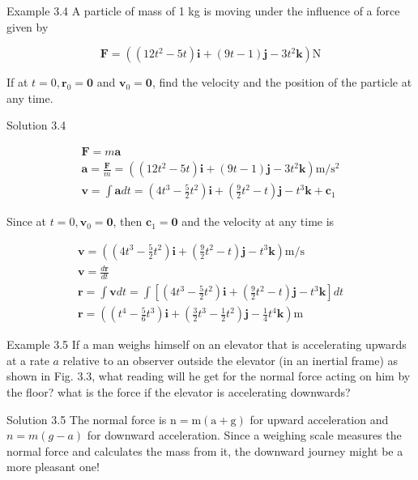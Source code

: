 \documentclass[10pt]{article}
\begin{document}
Example 3.4 A particle of mass of 1 kg is moving under the influence of a force given by

$$
\mathbf{F}=\left(\left(12 t^{2}-5 t\right) \mathbf{i}+(9 t-1) \mathbf{j}-3 t^{2} \mathbf{k}\right) \mathrm{N}
$$

If at $t=0, \mathbf{r}_{0}=\mathbf{0}$ and $\mathbf{v}_{0}=\mathbf{0}$, find the velocity and the position of the particle at any time.

Solution 3.4

$$
\begin{gathered}
\mathbf{F}=m \mathbf{a} \\
\mathbf{a}=\frac{\mathbf{F}}{m}=\left(\left(12 t^{2}-5 t\right) \mathbf{i}+(9 t-1) \mathbf{j}-3 t^{2} \mathbf{k}\right) \mathrm{m} / \mathrm{s}^{2} \\
\mathbf{v}=\int \mathbf{a} d t=\left(4 t^{3}-\frac{5}{2} t^{2}\right) \mathbf{i}+\left(\frac{9}{2} t^{2}-t\right) \mathbf{j}-t^{3} \mathbf{k}+\mathbf{c}_{1}
\end{gathered}
$$

Since at $t=0, \mathbf{v}_{0}=\mathbf{0}$, then $\mathbf{c}_{1}=\mathbf{0}$ and the velocity at any time is

$$
\begin{gathered}
\mathbf{v}=\left(\left(4 t^{3}-\frac{5}{2} t^{2}\right) \mathbf{i}+\left(\frac{9}{2} t^{2}-t\right) \mathbf{j}-t^{3} \mathbf{k}\right) \mathrm{m} / \mathrm{s} \\
\mathbf{v}=\frac{d \mathbf{r}}{d t} \\
\mathbf{r}=\int \mathbf{v} d t=\int\left[\left(4 t^{3}-\frac{5}{2} t^{2}\right) \mathbf{i}+\left(\frac{9}{2} t^{2}-t\right) \mathbf{j}-t^{3} \mathbf{k}\right] d t \\
\mathbf{r}=\left(\left(t^{4}-\frac{5}{6} t^{3}\right) \mathbf{i}+\left(\frac{3}{2} t^{3}-\frac{1}{2} t^{2}\right) \mathbf{j}-\frac{1}{4} t^{4} \mathbf{k}\right) \mathrm{m}
\end{gathered}
$$

Example 3.5 If a man weighs himself on an elevator that is accelerating upwards at a rate $a$ relative to an observer outside the elevator (in an inertial frame) as shown in Fig. 3.3, what reading will he get for the normal force acting on him by the floor? what is the force if the elevator is accelerating downwards?

Solution 3.5 The normal force is $\mathrm{n}=\mathrm{m}(\mathrm{a}+\mathrm{g})$ for upward acceleration and $n=m(g-a)$ for downward acceleration. Since a weighing scale measures the normal force and calculates the mass from it, the downward journey might be a more pleasant one!
\end{document}
